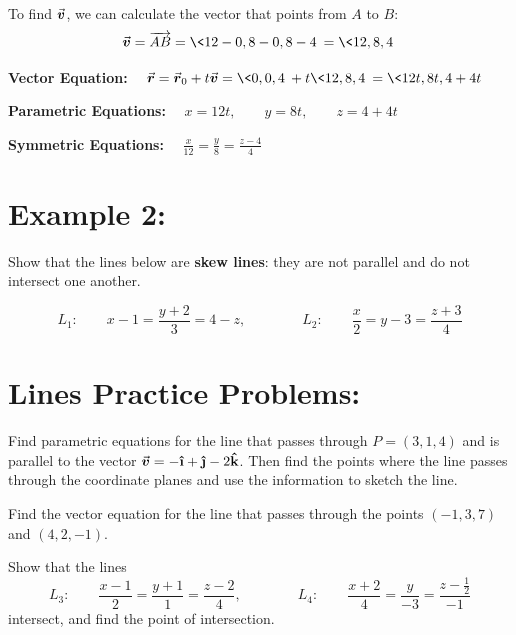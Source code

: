 To find \(\v\), we can calculate the vector that points from \(A\) to \(B\):
\[
\v = \overrightarrow{AB} = \<12-0, 8-0, 8-4\> = \<12, 8, 4\>
\]



\textbf{Vector Equation:}
\(\quad
\r = \r_0 + t \v = \<0, 0, 4\> + t \<12, 8, 4\> = \<12t, 8t, 4+4t\>
\)


\textbf{Parametric Equations:}
\(\quad
x = 12 t, \qquad y = 8 t, \qquad z = 4 + 4 t
\)



\textbf{Symmetric Equations:}
\(\quad
\frac{x}{12} = \frac{ y }{8} = \frac{z - 4}{4}
\)




\pagebreak

\section*{Example 2:} 
Show that the lines below are \textbf{skew lines}: they are not parallel and do not intersect one another.

\[
L_1: \qquad x -1 = \frac{y+2}{3} = 4-z, \qquad \qquad 
L_2: \qquad \frac{x}{2} = y-3 = \frac{z+3}{4}
\]

\vfill
\vfill

\section*{Lines Practice Problems:}


\begin{list}{\bf{Problem : }}{}

\item Find parametric equations for the line that passes through \(P=(3,1,4)\) and is parallel to the vector \(\v = -\ihat + \jhat -2\khat\).  Then find the points where the line passes through the coordinate planes and use the information to sketch the line.%

\vfill

\item Find the vector equation for the line that passes through the points \((-1, 3, 7)\) and \((4, 2, -1)\).

\vfill

\item  Show that the lines
\[
L_3:\qquad \frac{x-1}{2}= \frac{y+1}{1} = \frac{z-2}{4}, \qquad\qquad L_4: \qquad \frac{x+2}{4} = \frac{y}{-3} = \frac{z-\tfrac{1}{2}}{-1}
\]
intersect, and find the point of intersection.

\vfill

\end{list}


